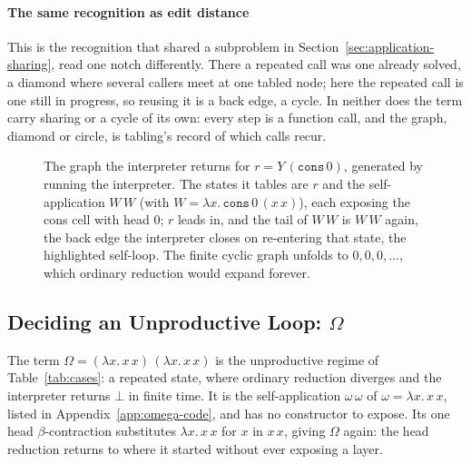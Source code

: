 \paragraph{The same recognition as edit distance}
This is the recognition that shared a subproblem in Section~\ref{sec:application-sharing}, read one notch differently. There a repeated call was one already solved, a diamond where several callers meet at one tabled node; here the repeated call is one still in progress, so reusing it is a back edge, a cycle. In neither does the term carry sharing or a cycle of its own: every step is a function call, and the graph, diamond or circle, is tabling's record of which calls recur.

\begin{figure}
  \centering
  
  \caption{The graph the interpreter returns for $r = Y\,(\mathtt{cons}\,0)$, generated by running the interpreter. The
    states it tables are $r$ and the self-application $W\,W$ (with $W = \lambda x.\,\mathtt{cons}\,0\,(x\,x)$), each
    exposing the cons cell with head $0$; $r$ leads in, and the tail of $W\,W$ is $W\,W$ again, the back edge the
    interpreter closes on re-entering that state, the highlighted self-loop. The finite cyclic graph unfolds to
  $0,0,0,\dots$, which ordinary reduction would expand forever.}
  \label{fig:cyclic-zeros}
\end{figure}

\subsection{Deciding an Unproductive Loop: $\Omega$}\label{sec:application-bottom}

The term $\Omega = (\lambda x.\,x\,x)\,(\lambda x.\,x\,x)$ is the unproductive regime of Table~\ref{tab:cases}: a repeated state, where ordinary reduction diverges and the interpreter returns $\bot$ in finite time. It is the self-application $\omega\,\omega$ of $\omega = \lambda x.\,x\,x$, listed in Appendix~\ref{app:omega-code}, and has no constructor to expose. Its one head $\beta$-contraction substitutes $\lambda x.\,x\,x$ for $x$ in $x\,x$, giving $\Omega$ again: the head reduction returns to where it started without ever exposing a layer.

